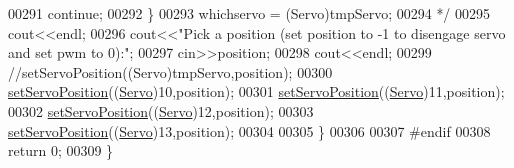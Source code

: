 \begin{DoxyCode}
00291 \textcolor{comment}{            continue;}
00292 \textcolor{comment}{        \}}
00293 \textcolor{comment}{        whichservo = (Servo)tmpServo;}
00294 \textcolor{comment}{        */} 
00295         cout<<endl;
00296         cout<<\textcolor{stringliteral}{"Pick a position (set position to -1 to disengage servo and set pwm to 0):"};
00297         cin>>position;
00298         cout<<endl;
00299         \textcolor{comment}{//setServoPosition((Servo)tmpServo,position); }
00300         \hyperlink{Servo__Position__Shell_8cpp_abd2cd3c2e36d42a2178a6f2fd12af905}{setServoPosition}((\hyperlink{Servo__Position__Shell_8h_af629c4ae98db77091b130c7fbc31cab2}{Servo})10,position);
00301         \hyperlink{Servo__Position__Shell_8cpp_abd2cd3c2e36d42a2178a6f2fd12af905}{setServoPosition}((\hyperlink{Servo__Position__Shell_8h_af629c4ae98db77091b130c7fbc31cab2}{Servo})11,position);
00302         \hyperlink{Servo__Position__Shell_8cpp_abd2cd3c2e36d42a2178a6f2fd12af905}{setServoPosition}((\hyperlink{Servo__Position__Shell_8h_af629c4ae98db77091b130c7fbc31cab2}{Servo})12,position);
00303         \hyperlink{Servo__Position__Shell_8cpp_abd2cd3c2e36d42a2178a6f2fd12af905}{setServoPosition}((\hyperlink{Servo__Position__Shell_8h_af629c4ae98db77091b130c7fbc31cab2}{Servo})13,position);
00304         
00305     \}
00306     
00307 \textcolor{preprocessor}{#endif}
00308     \textcolor{keywordflow}{return} 0;
00309 \}
\end{DoxyCode}
